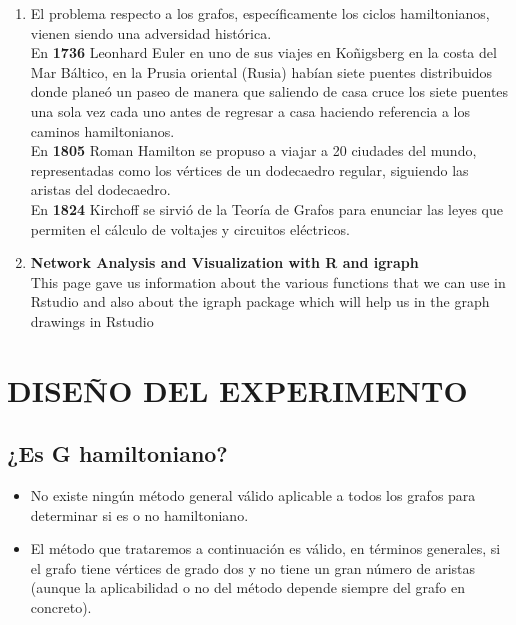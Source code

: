 \documentclass[journal]{IEEEtran}
\begin{document}
\begin{enumerate}
\item El problema respecto a los grafos, espec{\'i}ficamente los ciclos hamiltonianos, vienen siendo una adversidad hist{\'o}rica.\\
En \textbf{1736} Leonhard Euler en uno de sus viajes en Koñigsberg en la costa del Mar B{\'a}ltico, en la Prusia oriental (Rusia) hab{\'i}an siete puentes distribuidos donde plane{\'o} un paseo de manera que saliendo de casa cruce los siete puentes una sola vez cada uno antes de regresar a casa haciendo referencia a los caminos hamiltonianos.\\
En \textbf{1805} Roman Hamilton se propuso a viajar a 20 ciudades del mundo, representadas como los v{\'e}rtices de un dodecaedro regular, siguiendo las aristas del dodecaedro.\\
En \textbf{1824} Kirchoff se sirvi{\'o} de la Teor{\'i}a de Grafos para enunciar las leyes que permiten el c{\'a}lculo de voltajes y circuitos el{\'e}ctricos.

\item \textbf{Network Analysis and Visualization with R and igraph}\\
 This page gave us information about the various functions that we can use in Rstudio and also about the igraph package which will help us in the graph drawings in Rstudio\\

\end{enumerate}


\section{\large\bf DISE\~{N}O DEL EXPERIMENTO}
\subsection{¿Es G hamiltoniano?}
\begin{itemize}
	\item No existe ningún método general v{\'a}lido aplicable a todos los grafos para determinar si es o no hamiltoniano.
	\item	El m{\'e}todo que trataremos a continuaci{\'o}n es válido, en t{\'e}rminos generales, si el grafo tiene v{\'e}rtices de grado dos y no tiene un gran n{\'u}mero de aristas (aunque la aplicabilidad o no del m{\'e}todo depende siempre del grafo en concreto).
\end{itemize}
\end{document}

